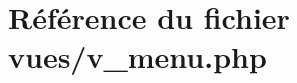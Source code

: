 \hypertarget{v__menu_8php}{}\section{Référence du fichier vues/v\+\_\+menu.php}
\label{v__menu_8php}
